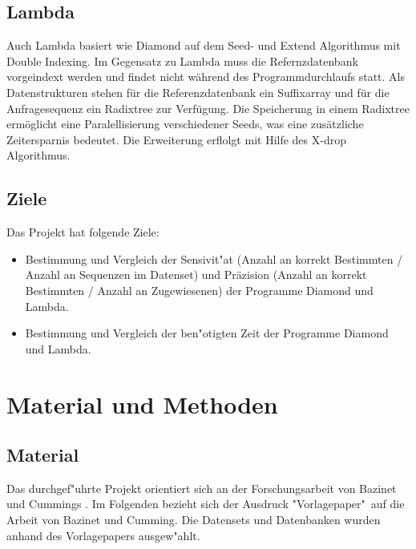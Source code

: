 \documentclass[10pt, a4paper]{article}[08.12.2015]
\begin{document}
    \subsection{\textrm{Lambda}}
    Auch Lambda \cite{hauswedell2014} basiert wie Diamond auf dem Seed- und Extend Algorithmus mit Double Indexing. Im Gegensatz zu Lambda muss die Refernzdatenbank vorgeindext werden und findet nicht w\"ahrend des Programmdurchlaufs statt. Als Datenstrukturen stehen f\"ur die Referenzdatenbank ein Suffixarray und f\"ur die Anfragesequenz ein Radixtree zur Verf\"ugung. Die Speicherung in einem Radixtree erm\"oglicht eine Paralellisierung verschiedener Seeds, was eine zus\"atzliche Zeitersparnis bedeutet. 
    Die Erweiterung erflolgt mit Hilfe des X-drop Algorithmus. 
    \newpage
    \subsection{Ziele}
    
    Das Projekt hat folgende Ziele:
    
    \begin{itemize}
    
      \item Bestimmung und Vergleich der Sensivit"at (Anzahl an korrekt Bestimmten / Anzahl an Sequenzen im Datenset) und Pr\"azision (Anzahl an korrekt Bestimmten / Anzahl an Zugewiesenen) der Programme \textrm{Diamond} 				und \textrm{Lambda}.
      
      \item Bestimmung und Vergleich der ben"otigten Zeit der Programme
      		\textrm{Diamond} und \textrm{Lambda}.

      
    
    \end{itemize}


    \newpage
  \section{Material und Methoden}
    
    \subsection{Material} 
    
      Das durchgef"uhrte Projekt orientiert sich an der Forschungsarbeit von
      Bazinet und Cummings \cite{bazinet2012}. Im 
      Folgenden bezieht sich der Ausdruck "Vorlagepaper"\ auf die Arbeit von
      Bazinet und Cumming. Die Datensets und Datenbanken wurden anhand des 			  Vorlagepapers ausgew"ahlt.
      
\end{document}
